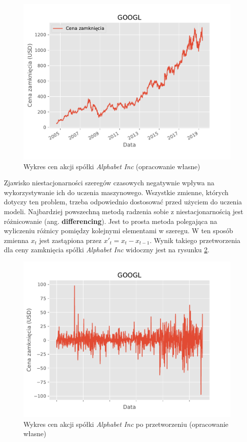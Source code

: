 \documentclass[a4paper, twoside, 11pt, openright]{article}
\begin{document}
\begin{figure}[H]
\centering 
\includegraphics[scale=0.9]{img/GOOGL_adj_close.pdf}
\caption{Wykres cen akcji spółki \textit{Alphabet Inc} (opracowanie własne)}
\label{img:non_stationary_adjusted_close}
\end{figure}

Zjawisko niestacjonarności szeregów czasowych negatywnie wpływa na wykorzystywanie ich do uczenia maszynowego. Wszystkie zmienne, których dotyczy ten problem, trzeba odpowiednio dostosować przed użyciem do uczenia modeli. Najbardziej powszechną metodą radzenia sobie z niestacjonarnością jest różnicowanie (ang. \textbf{differencing}). Jest to prosta metoda polegająca na wyliczeniu różnicy pomiędzy kolejnymi elementami w szeregu. W ten sposób zmienna $x_t$ jest zastąpiona przez $x'_t=x_t-x_{t-1}$. Wynik takiego przetworzenia dla ceny zamknięcia spółki \textit{Alphabet Inc} widoczny jest na rysunku \ref{img:stationary_adjusted_close}.


\begin{figure}[H]
\centering 
\includegraphics[scale=0.9]{img/adjusted_close_stationary.pdf}
\caption{Wykres cen akcji spółki \textit{Alphabet Inc} po przetworzeniu (opracowanie własne)}
\label{img:stationary_adjusted_close}
\end{figure}
\end{document}
